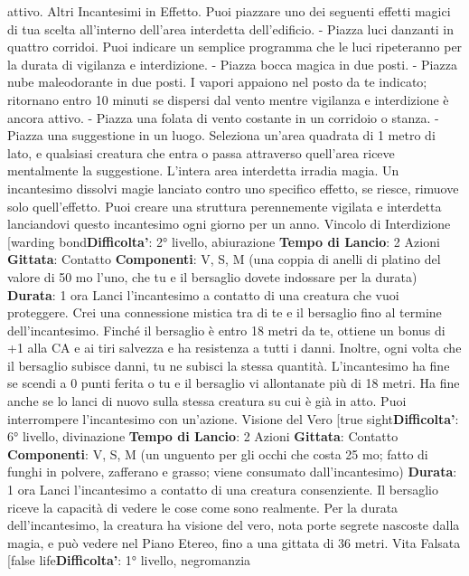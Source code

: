 \begin{multicols}{2}
attivo.
Altri Incantesimi in Effetto. Puoi piazzare uno dei
seguenti effetti magici di tua scelta all’interno dell’area
interdetta dell’edificio.
- Piazza luci danzanti in quattro corridoi. Puoi indicare
un semplice programma che le luci ripeteranno per
la durata di vigilanza e interdizione.
- Piazza bocca magica in due posti.
- Piazza nube maleodorante in due posti. I vapori
appaiono nel posto da te indicato; ritornano entro 10
minuti se dispersi dal vento mentre vigilanza e
interdizione è ancora attivo.
- Piazza una folata di vento costante in un corridoio o
stanza.
- Piazza una suggestione in un luogo. Seleziona
un’area quadrata di 1 metro di lato, e qualsiasi
creatura che entra o passa attraverso quell’area
riceve mentalmente la suggestione.
L’intera area interdetta irradia magia. Un incantesimo
dissolvi magie lanciato contro uno specifico effetto, se
riesce, rimuove solo quell’effetto.
Puoi creare una struttura perennemente vigilata e
interdetta lanciandovi questo incantesimo ogni giorno
per un anno.
Vincolo di Interdizione
[warding bond\textbf{Difficolta'}:
2° livello, abiurazione
\textbf{Tempo di Lancio}: 2 Azioni
\textbf{Gittata}: Contatto
\textbf{Componenti}: V, S, M (una coppia di anelli di platino del
valore di 50 mo l’uno, che tu e il bersaglio dovete
indossare per la durata)
\textbf{Durata}: 1 ora
Lanci l’incantesimo a contatto di una creatura che vuoi
proteggere. Crei una connessione mistica tra di te e il
bersaglio fino al termine dell’incantesimo. Finché il
bersaglio è entro 18 metri da te, ottiene un bonus di +1
alla CA e ai tiri salvezza e ha resistenza a tutti i danni.
Inoltre, ogni volta che il bersaglio subisce danni, tu ne
subisci la stessa quantità.
L’incantesimo ha fine se scendi a 0 punti ferita o tu e il
bersaglio vi allontanate più di 18 metri. Ha fine anche
se lo lanci di nuovo sulla stessa creatura su cui è già in
atto. Puoi interrompere l’incantesimo con un’azione.
Visione del Vero
[true sight\textbf{Difficolta'}:
6° livello, divinazione
\textbf{Tempo di Lancio}: 2 Azioni
\textbf{Gittata}: Contatto
\textbf{Componenti}: V, S, M (un unguento per gli occhi che
costa 25 mo; fatto di funghi in polvere, zafferano e
grasso; viene consumato dall’incantesimo)
\textbf{Durata}: 1 ora
Lanci l’incantesimo a contatto di una creatura
consenziente. Il bersaglio riceve la capacità di vedere le
cose come sono realmente. Per la durata
dell’incantesimo, la creatura ha visione del vero, nota
porte segrete nascoste dalla magia, e può vedere nel
Piano Etereo, fino a una gittata di 36 metri.
Vita Falsata
[false life\textbf{Difficolta'}:
1° livello, negromanzia

\end{multicols}
